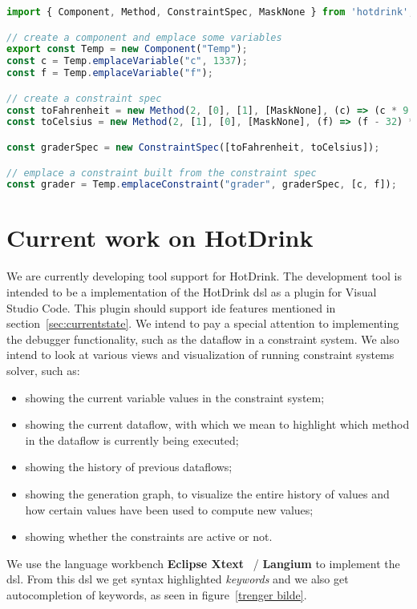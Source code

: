 \begin{lstlisting}[caption={Example of how to use the HotDrink \gls{api} to simulate the corranltion between fahrenheit and celsius},label=hotdrinkapi, language=JavaScript]
import { Component, Method, ConstraintSpec, MaskNone } from 'hotdrink';

// create a component and emplace some variables
export const Temp = new Component("Temp");
const c = Temp.emplaceVariable("c", 1337);
const f = Temp.emplaceVariable("f");

// create a constraint spec
const toFahrenheit = new Method(2, [0], [1], [MaskNone], (c) => (c * 9 / 5 + 32));
const toCelsius = new Method(2, [1], [0], [MaskNone], (f) => (f - 32) * 5 / 9);

const graderSpec = new ConstraintSpec([toFahrenheit, toCelsius]);

// emplace a constraint built from the constraint spec
const grader = Temp.emplaceConstraint("grader", graderSpec, [c, f]);
\end{lstlisting}

\section{Current work on HotDrink}
We are currently developing tool support for HotDrink. The development tool is intended 
to be a implementation of the HotDrink \gls{dsl} as a plugin for Visual Studio Code. 
This plugin should support \gls{ide} features mentioned in section~\ref{sec:currentstate}. 
We intend to pay a special attention to implementing the debugger functionality, such as 
the dataflow in a constraint system. We also intend to look at various views and 
visualization of running constraint systems solver, such as: 
\begin{itemize}
    \item showing the current variable values in the constraint system;
    \item showing the current dataflow, with which we mean to highlight which method in the dataflow is currently being executed;
    \item showing the history of previous dataflows;
    \item showing the generation graph, to visualize the entire history of values and how certain values have been used to compute new values;
    \item showing whether the constraints are active or not.
\end{itemize}

We use the language workbench \textbf{Eclipse Xtext}~\cite{eclipse-xtext} / 
\textbf{Langium} to implement the \gls{dsl}. From this \gls{dsl} we get syntax 
highlighted \textit{keywords} and we also get autocompletion of keywords, as seen in 
figure~\ref{trenger bilde}. 
